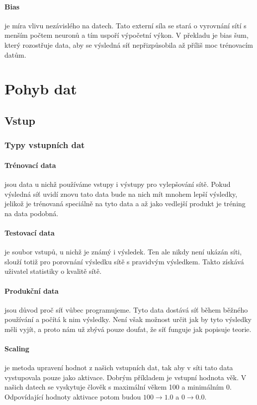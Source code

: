 \documentclass[12pt,a4paper]{report}
\begin{document}
	\paragraph{Bias}
	je míra vlivu nezávislého na datech. Tato externí síla se stará o vyrovnání sítí s menším počtem neuronů a tím uspoří výpočetní výkon. V překladu je bias šum, který rozostřuje data, aby se výsledná síť nepřizpůsobila až příliš moc trénovacím datům.
		
\section{Pohyb dat}
	\subsection{Vstup}
		\subsubsection{Typy vstupních dat}
			\paragraph{Trénovací data}
			jsou data u nichž používáme vstupy i výstupy pro vylepšování sítě. Pokud výsledná síť uvidí znovu tato data bude na nich mít mnohem lepší výsledky, jelikož je trénovaná speciálně na tyto data a až jako vedlejší produkt je tréning na data podobná.
			\paragraph{Testovací data}
			je soubor vstupů, u nichž je známý i výsledek. Ten ale nikdy není ukázán síti, slouží totiž pro porovnání výsledku sítě s pravidvým výsledkem. Takto získává uživatel statistiky o kvalitě sítě.
			\paragraph{Produkční data}
			jsou důvod proč síť vůbec programujeme. Tyto data dostává síť během běžného používání a počítá k nim výsledky. Není však možnost určit jak by tyto výsledky měli vyjít, a proto nám už zbývá pouze doufat, že síť funguje jak popisuje teorie.
		\paragraph{Scaling}
		je metoda upravení hodnot z našich vstupních dat, tak aby v síti tato data vystupovala pouze jako aktivace. Dobrým příkladem je vstupní hodnota věk. V našich datech se vyskytuje člověk s maximální věkem 100 a minimálním 0. Odpovídající hodnoty aktivace potom budou $100\rightarrow1.0$ a $0\rightarrow0.0$.
\end{document}
